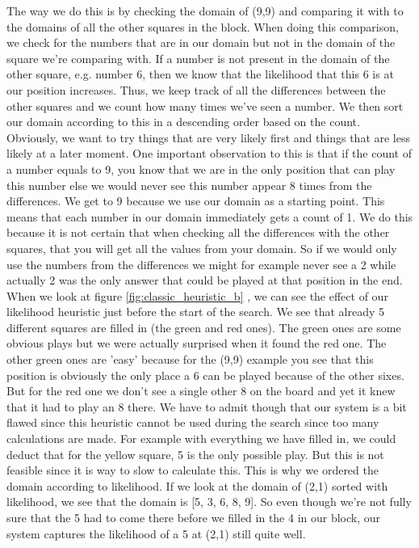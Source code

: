 \documentclass{report}
\begin{document}
The way we do this is by checking the domain of (9,9) and comparing it with to the domains of all the other squares in the block. When doing this comparison, we check for the numbers that are in our domain but not in the domain of the square we're comparing with. If a number is not present in the domain of the other square, e.g. number 6, then we know that the likelihood that this 6 is at our position increases. Thus, we keep track of all the differences between the other squares and we count how many times we've seen a number. We then sort our domain according to this in a descending order based on the count. Obviously, we want to try things that are very likely first and things that are less likely at a later moment. One important observation to this is that if the count of a number equals to 9, you know that we are in the only position that can play this number else we would never see this number appear 8 times from the differences. We get to 9 because we use our domain as a starting point. This means that each number in our domain immediately gets a count of 1. We do this because it is not certain that when checking all the differences with the other squares, that you will get all the values from your domain. So if we would only use the numbers from the differences we might for example never see a 2 while actually 2 was the only answer that could be played at that position in the end.
\newline
\newline
When we look at figure \ref{fig:classic_heuristic_b} , we can see the effect of our likelihood heuristic just before the start of the search. We see that already 5 different squares are filled in (the green and red ones). The green ones are some obvious plays but we were actually surprised when it found the red one. The other green ones are 'easy' because for the (9,9) example you see that this position is obviously the only place a 6 can be played because of the other sixes. But for the red one we don't see a single other 8 on the board and yet it knew that it had to play an 8 there. We have to admit though that our system is a bit flawed since this heuristic cannot be used during the search since too many calculations are made. For example with everything we have filled in, we could deduct that for the yellow square, 5 is the only possible play. But this is not feasible since it is way to slow to calculate this. This is why we ordered the domain according to likelihood. If we look at the domain of (2,1) sorted with likelihood, we see that the domain is [5, 3, 6, 8, 9]. So even though we're not fully sure that the 5 had to come there before we filled in the 4 in our block, our system captures the likelihood of a 5 at (2,1) still quite well.
\end{document}
